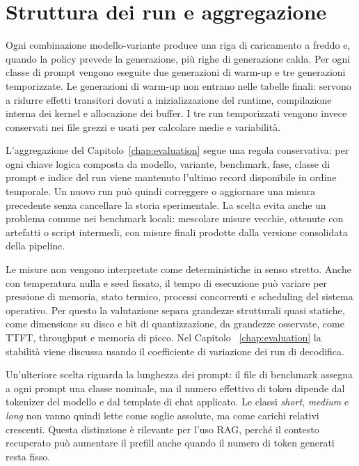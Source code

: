 \section{Struttura dei run e aggregazione}
\label{sec:experimental_run_structure}

Ogni combinazione modello-variante produce una riga di caricamento a freddo e,
quando la policy prevede la generazione, più righe di generazione calda. Per
ogni classe di prompt vengono eseguite due generazioni di warm-up e tre
generazioni temporizzate. Le generazioni di warm-up non entrano nelle tabelle
finali: servono a ridurre effetti transitori dovuti a inizializzazione del
runtime, compilazione interna dei kernel e allocazione dei buffer. I tre run
temporizzati vengono invece conservati nei file grezzi e usati per calcolare
medie e variabilità.

L'aggregazione del Capitolo~\ref{chap:evaluation} segue una regola
conservativa: per ogni chiave logica composta da modello, variante, benchmark,
fase, classe di prompt e indice del run viene mantenuto l'ultimo record
disponibile in ordine temporale. Un nuovo run può quindi correggere o
aggiornare una misura precedente senza cancellare la storia sperimentale. La
scelta evita anche un problema comune nei benchmark locali: mescolare misure
vecchie, ottenute con artefatti o script intermedi, con misure finali prodotte
dalla versione consolidata della pipeline.

Le misure non vengono interpretate come deterministiche in senso stretto. Anche
con temperatura nulla e seed fissato, il tempo di esecuzione può variare per
pressione di memoria, stato termico, processi concorrenti e scheduling del
sistema operativo. Per questo la valutazione separa grandezze strutturali
quasi statiche, come dimensione su disco e bit di quantizzazione, da grandezze
osservate, come TTFT, throughput e memoria di picco. Nel Capitolo
~\ref{chap:evaluation} la stabilità viene discussa usando il coefficiente di
variazione dei run di decodifica.

Un'ulteriore scelta riguarda la lunghezza dei prompt: il file di benchmark
assegna a ogni prompt una classe nominale, ma il numero effettivo di token
dipende dal tokenizer del modello e dal template di chat applicato. Le classi
\emph{short}, \emph{medium} e \emph{long} non vanno quindi lette come soglie
assolute, ma come carichi relativi crescenti. Questa distinzione è rilevante per
l'uso RAG, perché il contesto recuperato può aumentare il prefill anche quando
il numero di token generati resta fisso.

